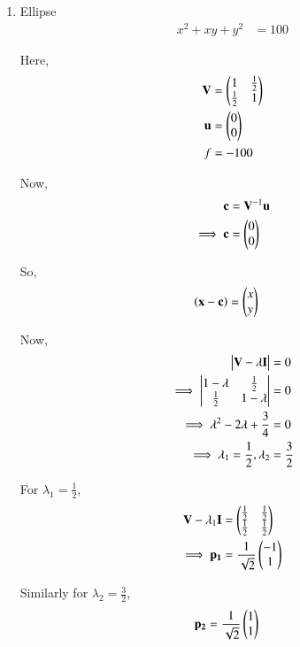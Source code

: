 \documentclass[journal,12pt,twocolumn]{IEEEtran}
\begin{document}
\begin{enumerate}
    \item Ellipse
    \begin{align}
        x^2+xy+y^2 &= 100
    \end{align}
    
    Here,
    \begin{align}
    \mathbf{V} &= \begin{pmatrix}1 & \frac{1}{2} \\ \frac{1}{2} & 1\end{pmatrix} \\
    \mathbf{u} &= \begin{pmatrix}0 \\ 0\end{pmatrix} \\
    f &= -100
    \end{align}

    Now,
    \begin{align}
    \mathbf{c} &= \mathbf{V}^{-1}\mathbf{u}\\
    \implies \mathbf{c} &= \begin{pmatrix}0 \\ 0\end{pmatrix}
    \end{align}

    So,
    \begin{align}
    \left(\mathbf{x}-\mathbf{c}\right) &= \begin{pmatrix}x \\ y\end{pmatrix}
    \end{align}
    
    Now,
    \begin{align}
        \begin{vmatrix}\mathbf{V}-\lambda\mathbf{I}\end{vmatrix} &= 0 \\
        \implies \begin{vmatrix}1-\lambda & \frac{1}{2} \\ \frac{1}{2} & 1-\lambda\end{vmatrix} &= 0 \\
        \implies \lambda^2-2\lambda+\frac{3}{4} &= 0 \\
        \implies \lambda_1 =\frac{1}{2},\lambda_2 &= \frac{3}{2}
    \end{align}
    
    For $\lambda_1=\frac{1}{2}$,
    \begin{align}
        \mathbf{V}-\lambda_1\mathbf{I} &= \begin{pmatrix}\frac{1}{2} & \frac{1}{2} \\ \frac{1}{2} & \frac{1}{2}\end{pmatrix} \\
        \implies \mathbf{p_1} &= \frac{1}{\sqrt{2}}\begin{pmatrix}-1 \\ 1\end{pmatrix}
    \end{align}
    
    Similarly for $\lambda_2=\frac{3}{2}$,
    \begin{align}
        \mathbf{p_2} &= \frac{1}{\sqrt{2}}\begin{pmatrix}1 \\ 1\end{pmatrix}
    \end{align}
    

\end{enumerate}
\end{document}
